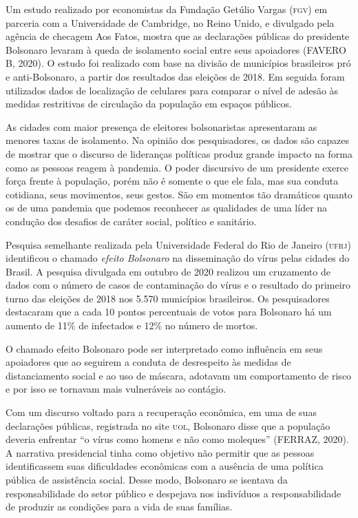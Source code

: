 Um estudo realizado por economistas da Fundação Getúlio Vargas (\textsc{fgv}) em
parceria com a Universidade de Cambridge, no Reino Unido, e divulgado
pela agência de checagem Aos Fatos, mostra que as declarações públicas
do presidente Bolsonaro levaram à queda de isolamento social entre seus
apoiadores (FAVERO B, 2020). O estudo foi realizado com base na divisão
de municípios brasileiros pró e anti-Bolsonaro, a partir dos resultados
das eleições de 2018. Em seguida foram utilizados dados de localização
de celulares para comparar o nível de adesão às medidas restritivas de
circulação da população em espaços públicos.

As cidades com maior presença de eleitores bolsonaristas apresentaram as
menores taxas de isolamento. Na opinião dos pesquisadores, os dados são
capazes de mostrar que o discurso de lideranças políticas produz grande
impacto na forma como as pessoas reagem à pandemia. O poder discursivo
de um presidente exerce força frente à população, porém não é somente o
que ele fala, mas sua conduta cotidiana, seus movimentos, seus gestos.
São em momentos tão dramáticos quanto os de uma pandemia que podemos
reconhecer as qualidades de uma líder na condução dos desafios de
caráter social, político e sanitário.

Pesquisa semelhante realizada pela Universidade Federal do Rio de
Janeiro (\textsc{ufrj}) identificou o chamado \textit{efeito Bolsonaro} na
disseminação do vírus pelas cidades do Brasil. A pesquisa divulgada em
outubro de 2020 realizou um cruzamento de dados com o número de casos de
contaminação do vírus e o resultado do primeiro turno das eleições de 2018
nos 5.570 municípios brasileiros. Os pesquisadores destacaram que a cada
10 pontos percentuais de votos para Bolsonaro há um aumento de 11\% de
infectados e 12\% no número de mortos.

O chamado efeito Bolsonaro pode ser interpretado como influência em seus
apoiadores que ao seguirem a conduta de desrespeito às medidas de
distanciamento social e ao uso de máscara, adotavam um comportamento de
risco e por isso se tornavam mais vulneráveis ao contágio.

Com um discurso voltado para a recuperação econômica, em uma de suas
declarações públicas, registrada no site \textsc{uol}, Bolsonaro disse que a
população deveria enfrentar ``o vírus como homens e não como moleques''
(FERRAZ, 2020). A narrativa presidencial tinha como objetivo não
permitir que as pessoas identificassem suas dificuldades econômicas com
a ausência de uma política pública de assistência social. Desse modo,
Bolsonaro se isentava da responsabilidade do setor público e despejava
nos indivíduos a responsabilidade de produzir as condições para a vida
de suas famílias.

